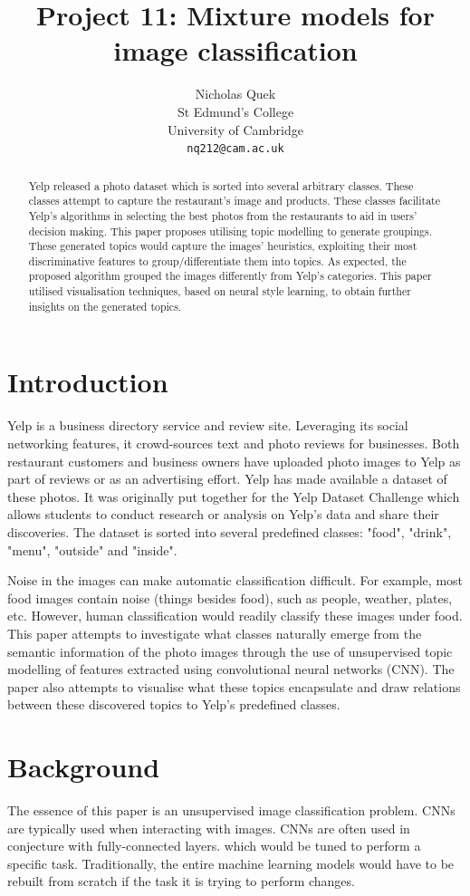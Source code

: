 \documentclass{article}
\title{Project 11: Mixture models for image classification}
\author{%
  Nicholas Quek \\
  St Edmund's College\\
  University of Cambridge\\
  \texttt{nq212@cam.ac.uk} \\
}
\begin{document}
\maketitle

\begin{abstract}
Yelp released a photo dataset which is sorted into several arbitrary classes. These classes attempt to capture the restaurant's image and products. These classes facilitate Yelp's algorithms in selecting the best photos from the restaurants to aid in users' decision making. This paper proposes utilising topic modelling to generate groupings. These generated topics would capture the images' heuristics, exploiting their most discriminative features to group/differentiate them into topics. As expected, the proposed algorithm grouped the images differently from Yelp's categories. This paper utilised visualisation techniques, based on neural style learning, to obtain further insights on the generated topics. 
\end{abstract}

\section{Introduction}
Yelp is a business directory service and review site. Leveraging its social networking features, it crowd-sources text and photo reviews for businesses. Both restaurant customers and business owners have uploaded photo images to Yelp as part of reviews or as an advertising effort. Yelp has made available a dataset of these photos. It was originally put together for the Yelp Dataset Challenge which allows students to conduct research or analysis on Yelp's data and share their discoveries. The dataset is sorted into several predefined classes: "food", "drink", "menu", "outside" and "inside". 

Noise in the images can make automatic classification difficult. For example, most food images contain noise (things besides food), such as people, weather, plates, etc. However, human classification would readily classify these images under food. This paper attempts to investigate what classes naturally emerge from the semantic information of the photo images through the use of unsupervised topic modelling of features extracted using convolutional neural networks (CNN). The paper also attempts to visualise what these topics encapsulate and draw relations between these discovered topics to Yelp's predefined classes.

\section{Background}
The essence of this paper is an unsupervised image classification problem. CNNs are typically used when interacting with images. CNNs are often used in conjecture with fully-connected layers. which would be tuned to perform a specific task. Traditionally, the entire machine learning models would have to be rebuilt from scratch if the task it is trying to perform changes.  
\end{document}

